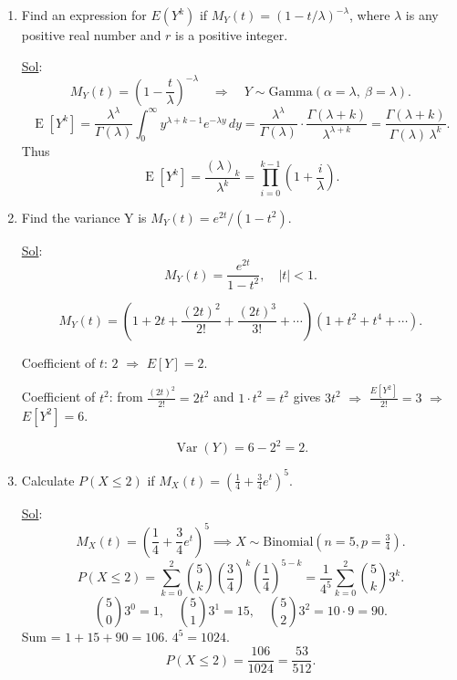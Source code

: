 \begin{enumerate}
	\item[14.] Find an expression for \(E(Y^k)\) if \(M_Y (t) = (1 - t / \lambda)^{- \lambda}\), where \(\lambda\) is any positive real number and \(r\) is a positive integer.

	      \underline{Sol}: \\

	      \[
		      M_Y(t) = \left(1 - \frac{t}{\lambda}\right)^{-\lambda} \quad\Rightarrow\quad Y \sim \text{Gamma}(\alpha=\lambda,\ \beta=\lambda).
	      \]
	      \[
		      \operatorname{E}[Y^k] = \frac{\lambda^\lambda}{\Gamma(\lambda)} \int_0^\infty y^{\lambda+k-1} e^{-\lambda y}\,dy
		      = \frac{\lambda^\lambda}{\Gamma(\lambda)} \cdot \frac{\Gamma(\lambda+k)}{\lambda^{\lambda+k}}
		      = \frac{\Gamma(\lambda+k)}{\Gamma(\lambda)\,\lambda^k}.
	      \]
	      Thus
	      \[
		      \boxed{\operatorname{E}[Y^k] = \frac{(\lambda)_k}{\lambda^k} = \prod_{i=0}^{k-1}\left(1+\frac{i}{\lambda}\right)}.
	      \]

	\item[16.] Find the variance Y is \(M_Y (t) = e^{2t} / (1 - t^2)\).

	      \underline{Sol}: \\

	      \[
		      M_Y(t) = \frac{e^{2t}}{1-t^2},\quad |t|<1.
	      \]

	      \[
		      M_Y(t) = \left(1 + 2t + \frac{(2t)^2}{2!} + \frac{(2t)^3}{3!} + \cdots\right)\left(1 + t^2 + t^4 + \cdots\right).
	      \]

	      Coefficient of \(t\): \(2\) \(\Rightarrow\) \(E[Y]=2\).

	      Coefficient of \(t^2\): from \( \frac{(2t)^2}{2!}=2t^2 \) and \(1\cdot t^2 = t^2 \) gives \(3t^2\) \(\Rightarrow\) \(\frac{E[Y^2]}{2!}=3\) \(\Rightarrow\) \(E[Y^2]=6\).

	      \[
		      \operatorname{Var}(Y)=6-2^2=2.
	      \]

	\item[20.] Calculate \(P(X \leq 2)\) if \(M_X (t) = (\frac{1}{4} + \frac{3}{4}e^t)^5\).

	      \underline{Sol}: \\

	      \[
		      M_X(t) = \left(\frac14 + \frac34 e^t\right)^5 \implies X \sim \text{Binomial}(n=5, p=\tfrac34).
	      \]
	      \[
		      P(X \le 2) = \sum_{k=0}^2 \binom{5}{k} \left(\frac34\right)^k \left(\frac14\right)^{5-k}
		      = \frac{1}{4^5} \sum_{k=0}^2 \binom{5}{k} 3^k.
	      \]
	      \[
		      \binom{5}{0}3^0 = 1,\quad \binom{5}{1}3^1 = 15,\quad \binom{5}{2}3^2 = 10\cdot 9 = 90.
	      \]
	      Sum = \(1+15+90 = 106\). \(4^5 = 1024\). \[
		      P(X \le 2) = \frac{106}{1024} = \frac{53}{512}.
	      \]


\end{enumerate}
